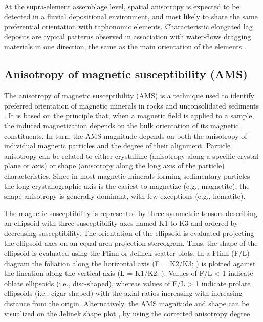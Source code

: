 \documentclass[review,times,authoryear]{elsarticle} %
\begin{document}
At the supra-element assemblage level, spatial anisotropy is expected to be detected in a fluvial depositional environment, and most likely to share the same preferential orientation with taphonomic elements. Characteristic elongated lag deposits are typical patterns observed in association with water-flows dragging materials in one direction, the same as the main orientation of the elements \citep{Dominguez-Rodrigo2012}.

\subsection{Anisotropy of magnetic susceptibility (AMS)}

The anisotropy of magnetic susceptibility (AMS) is a technique used to identify preferred orientation of magnetic minerals in rocks and unconsolidated sediments \citep{Hrouda1982,Tarling1993}. It is based on the principle that, when a magnetic field is applied to a sample, the induced magnetization depends on the bulk orientation of its magnetic constituents. In turn, the AMS magnitude depends on both the anisotropy of individual magnetic particles and the degree of their alignment. Particle anisotropy can be related to either crystalline (anisotropy along a specific crystal plane or axis) or shape (anisotropy along the long axis of the particle) characteristics. Since in most magnetic minerals forming sedimentary particles the long crystallographic axis is the easiest to magnetize (e.g., magnetite), the shape anisotropy is generally dominant, with few exceptions (e.g., hematite).

The magnetic susceptibility is represented by three symmetric tensors describing an ellipsoid with three susceptibility axes named K1 to K3 and ordered by decreasing susceptibility. The orientation of the ellipsoid is evaluated projecting the ellipsoid axes on an equal-area projection stereogram. Thus, the shape of the ellipsoid is evaluated using the Flinn or Jelinek scatter plots. In a Flinn (F/L) diagram the foliation along the horizontal axis (F = K2/K3; \citealp{Stacey1960}) is plotted against the lineation along the vertical axis (L = K1/K2; \citealp{Balsey1960}). Values of F/L < 1 indicate oblate ellipsoids (i.e., disc-shaped), whereas values of F/L > 1 indicate prolate ellipsoids (i.e., cigar-shaped) with the axial ratios increasing with increasing distance from the origin. Alternatively, the AMS magnitude and shape can be visualized on the Jelinek shape plot \citep{Jelinek1981}, by using the corrected anisotropy degree
\end{document}
